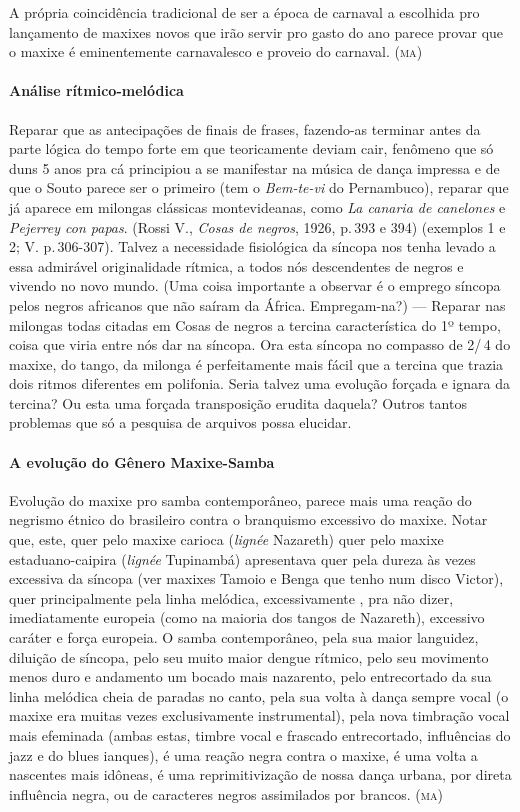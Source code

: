 A própria coincidência tradicional de ser a época de carnaval a
escolhida pro lançamento de maxixes novos que irão servir pro gasto do
ano parece provar que o maxixe é eminentemente carnavalesco e proveio do
carnaval. (\textsc{ma})

\paragraph{Análise rítmico-melódica}

Reparar que as antecipações de finais de frases, fazendo-as terminar
antes da parte lógica do tempo forte em que teoricamente deviam cair,
fenômeno que só duns 5 anos pra cá principiou a se manifestar na música
de dança impressa e de que o Souto parece ser o primeiro (tem o
\emph{Bem-te-vi} do Pernambuco), reparar que já aparece em milongas
clássicas montevideanas, como \emph{La canaria de canelones} e
\emph{Pejerrey con papas}. (Rossi V., \emph{Cosas de negros}, 1926,
p.\,393 e 394) (exemplos 1 e 2; V. p.\,306-307). Talvez a necessidade
fisiológica da síncopa nos tenha levado a essa admirável originalidade
rítmica, a todos nós descendentes de negros e vivendo no novo mundo.
(Uma coisa importante a observar é o emprego síncopa pelos negros
africanos que não saíram da África. Empregam-na?) --- Reparar nas milongas
todas citadas em Cosas de negros a tercina característica do 1º tempo,
coisa que viria entre nós dar na síncopa. Ora esta síncopa no compasso
de 2/\,4 do maxixe, do tango, da milonga é perfeitamente mais fácil que a
tercina que trazia dois ritmos diferentes em polifonia. Seria talvez uma
evolução forçada e ignara da tercina? Ou esta uma forçada transposição
erudita daquela? Outros tantos problemas que só a pesquisa de arquivos
possa elucidar.

\paragraph{A evolução do Gênero Maxixe-Samba}

Evolução do maxixe pro samba contemporâneo, parece mais uma reação do
negrismo étnico do brasileiro contra o branquismo excessivo do maxixe.
Notar que, este, quer pelo maxixe carioca (\emph{lignée} Nazareth) quer
pelo maxixe estaduano-caipira (\emph{lignée} Tupinambá) apresentava quer
pela dureza às vezes excessiva da síncopa (ver maxixes Tamoio e Benga
que tenho num disco Victor), quer principalmente pela linha melódica,
excessivamente , pra não dizer, imediatamente europeia (como na
maioria dos tangos de Nazareth), excessivo caráter e força europeia. O
samba contemporâneo, pela sua maior languidez, diluição de síncopa, pelo
seu muito maior dengue rítmico, pelo seu movimento menos duro e
andamento um bocado mais nazarento, pelo entrecortado da sua linha
melódica cheia de paradas no canto, pela sua volta à dança sempre vocal
(o maxixe era muitas vezes exclusivamente instrumental), pela nova
timbração vocal mais efeminada (ambas estas, timbre vocal e frascado
entrecortado, influências do jazz e do blues ianques), é uma reação negra
contra o maxixe, é uma volta a nascentes mais idôneas, é uma
reprimitivização de nossa dança urbana, por direta influência negra, ou
de caracteres negros assimilados por brancos. (\textsc{ma})


